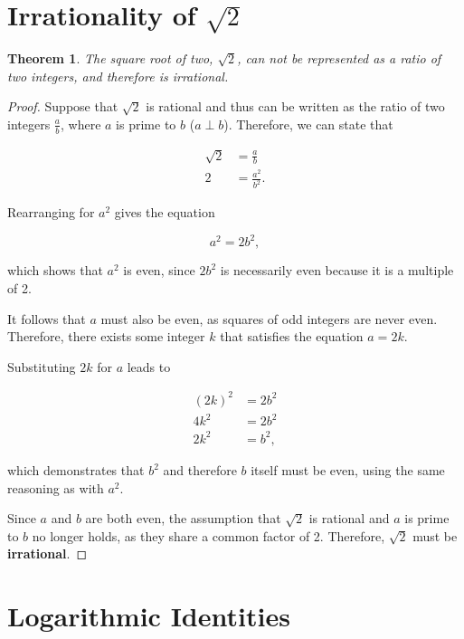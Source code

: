 \documentclass[parskip]{scrartcl}
\newtheorem{theorem}{Theorem}
\begin{document}
\section{Irrationality of \(\sqrt{2}\)}

\begin{theorem}
  The square root of two, \(\sqrt{2}\), can not be represented as a ratio of two
  integers, and therefore is irrational.
\end{theorem}

\begin{proof}
  Suppose that \(\sqrt{2}\) is rational and thus can be written as the ratio of
  two integers \(\frac{a}{b}\), where \(a\) is prime to \(b\) (\(a ⟂ b\)).
  Therefore, we can state that

  \begin{align*}
    \sqrt{2} &= \frac{a}{b} \\
    2 &= \frac{a^{2}}{b^{2}}.
  \end{align*}

  Rearranging for \(a^{2}\) gives the equation

  \begin{equation*}
    a^{2} = 2b^{2},
  \end{equation*}

  which shows that \(a^{2}\) is even, since \(2b^{2}\) is necessarily even
  because it is a multiple of 2.

  It follows that \(a\) must also be even, as squares of odd integers are never
  even. Therefore, there exists some integer \(k\) that satisfies the equation
  \(a = 2k\).

  Substituting \(2k\) for \(a\) leads to

  \begin{align*}
    {(2k)}^{2} &= 2b^{2} \\
    4k^{2} &= 2b^{2} \\
    2k^{2} &= b^{2},
  \end{align*}

  which demonstrates that \(b^{2}\) and therefore \(b\) itself must be even,
  using the same reasoning as with \(a^{2}\).

  Since \(a\) and \(b\) are both even, the assumption that \(\sqrt{2}\) is
  rational and \(a\) is prime to \(b\) no longer holds, as they share a common
  factor of 2. Therefore, \(\sqrt{2}\) must be \textbf{irrational}.
\end{proof}

\section{Logarithmic Identities}
\end{document}
